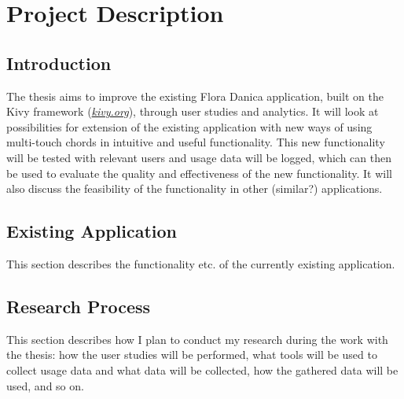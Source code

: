 
\chapter{Project Description} %

\label{Chapter1} %



\section{Introduction}

The thesis aims to improve the existing Flora Danica application, built on the Kivy framework (\emph{\href{http://www.kivy.org}{kivy.org}}), through user studies and analytics. It will look at possibilities for extension of the existing application with new ways of using multi-touch chords in intuitive and useful functionality. This new functionality will be tested with relevant users and usage data will be logged, which can then be used to evaluate the quality and effectiveness of the new functionality. It will also discuss the feasibility of the functionality in other (similar?) applications.


\section{Existing Application}

This section describes the functionality etc. of the currently existing application.


\section{Research Process}

This section describes how I plan to conduct my research during the work with the thesis: how the user studies will be performed, what tools will be used to collect usage data and what data will be collected, how the gathered data will be used, and so on.